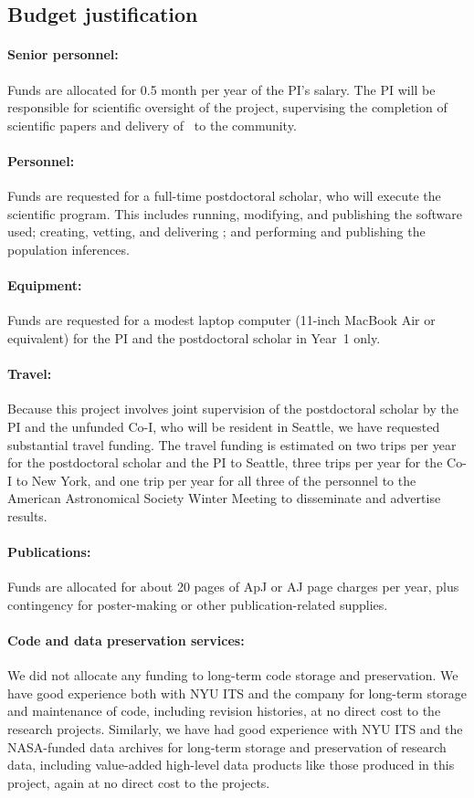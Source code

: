 \documentclass[12pt]{article}
\begin{document}
\subsection*{Budget justification}

\paragraph{Senior personnel:}
Funds are allocated for 0.5 month per year of the PI's salary.
The PI will be responsible for scientific oversight of the project,
supervising the completion of scientific papers and delivery of
\catalogname\ to the community.

\paragraph{Personnel:}
Funds are requested for a full-time postdoctoral scholar, who will
execute the scientific program.
This includes running, modifying, and publishing the software used;
creating, vetting, and delivering \catalogname;
and performing and publishing the population inferences.

\paragraph{Equipment:}
Funds are requested for a modest laptop computer (11-inch MacBook Air
or equivalent) for the PI and the postdoctoral scholar in Year~1 only.

\paragraph{Travel:}
Because this project involves joint supervision of the postdoctoral
scholar by the PI and the unfunded Co-I, who will be resident in
Seattle, we have requested substantial travel funding.
The travel funding is estimated on two trips per year for the
postdoctoral scholar and the PI to Seattle, three trips per year
for the Co-I to New York, and one trip per year for all three of
the personnel to the American Astronomical
Society Winter Meeting to disseminate and advertise results.

\paragraph{Publications:}
Funds are allocated for about 20 pages of ApJ or AJ page charges per
year, plus contingency for poster-making or other publication-related
supplies.

\paragraph{Code and data preservation services:}
We did not allocate any funding to long-term code storage and
preservation.
We have good experience both with NYU ITS and the company
 for long-term storage and maintenance of code,
including revision histories, at no direct cost to the research
projects.
Similarly, we have had good experience with NYU ITS and the
NASA-funded data archives for long-term storage and preservation
of research data, including value-added high-level data products
like those produced in this project, again at no direct cost to
the projects.
\end{document}
